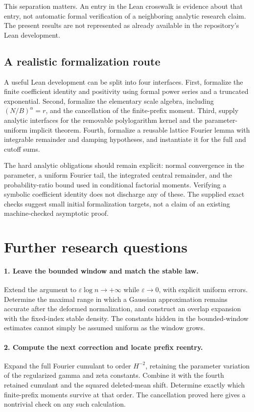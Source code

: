 \documentclass[11pt,a4paper]{article}
\numberwithin{equation}{section}
\theoremstyle{definition}
\theoremstyle{remark}
\newcommand{\eps}{\varepsilon}
\begin{document}
This separation matters. An entry in the Lean crosswalk is evidence about
that entry, not automatic formal verification of a neighboring analytic
research claim. The present results are not represented as already available
in the repository's Lean development.

\subsection{A realistic formalization route}
A useful Lean development can be split into four interfaces.
First, formalize the finite coefficient identity and positivity using formal
power series and a truncated exponential. Second, formalize the elementary
scale algebra, including \((N/B)^\alpha=r\), and the cancellation of the
finite-prefix moment. Third, supply analytic interfaces for the removable
polylogarithm kernel and the parameter-uniform implicit theorem. Fourth,
formalize a reusable lattice Fourier lemma with integrable remainder and
damping hypotheses, and instantiate it for the full and cutoff sums.

The hard analytic obligations should remain explicit: normal convergence
in the parameter, a uniform Fourier tail, the integrated central remainder,
and the probability-ratio bound used in conditional factorial moments.
Verifying a symbolic coefficient identity does not discharge any of these.
The supplied exact checks suggest small initial formalization targets, not
a claim of an existing machine-checked asymptotic proof.

\section{Further research questions}
\label{sec:further}

\paragraph{1. Leave the bounded window and match the stable law.}
Extend the argument to \(\eps\log n\to+\infty\) while \(\eps\to0\),
with explicit uniform errors. Determine the maximal range in which a
Gaussian approximation remains accurate after the deformed normalization,
and construct an overlap expansion with the fixed-index stable density.
The constants hidden in the bounded-window estimates cannot simply be
assumed uniform as the window grows.

\paragraph{2. Compute the next correction and locate prefix reentry.}
Expand the full Fourier cumulant to order \(H^{-2}\), retaining the parameter
variation of the regularized gamma and zeta constants. Combine it with the
fourth retained cumulant and the squared deleted-mean shift. Determine exactly
which finite-prefix moments survive at that order. The cancellation proved
here gives a nontrivial check on any such calculation.
\end{document}
